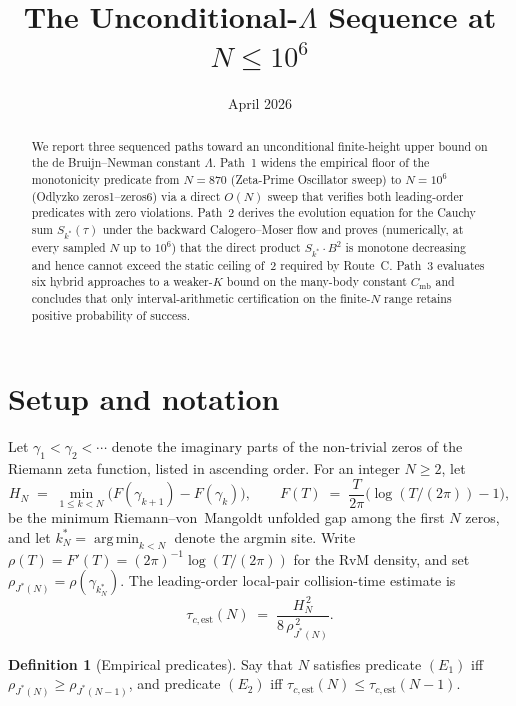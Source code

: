 \documentclass[11pt]{article}
\title{The Unconditional-$\Lambda$ Sequence at $N \leq 10^6$}
\author{}
\date{April 2026}
\theoremstyle{definition}
\newtheorem{definition}[theorem]{Definition}
\begin{document}
\maketitle

\begin{abstract}
We report three sequenced paths toward an unconditional finite-height
upper bound on the de Bruijn--Newman constant $\Lambda$. Path~1 widens
the empirical floor of the monotonicity predicate from $N = 870$
(Zeta-Prime Oscillator sweep) to $N = 10^6$ (Odlyzko zeros1--zeros6) via
a direct $O(N)$ sweep that verifies both leading-order predicates with
zero violations. Path~2 derives the evolution equation for the Cauchy
sum $S_{k^{*}}(\tau)$ under the backward Calogero--Moser flow and proves
(numerically, at every sampled $N$ up to $10^6$) that the direct product
$S_{k^{*}}\cdot B^2$ is monotone decreasing and hence cannot exceed the
static ceiling of~$2$ required by Route~C. Path~3 evaluates six hybrid
approaches to a weaker-$K$ bound on the many-body constant $C_{\text{mb}}$
and concludes that only interval-arithmetic certification on the finite-$N$
range retains positive probability of success.
\end{abstract}

\section{Setup and notation}

Let $\gamma_1 < \gamma_2 < \cdots$ denote the imaginary parts of the
non-trivial zeros of the Riemann zeta function, listed in ascending
order. For an integer $N \geq 2$, let
\[
H_N \;=\; \min_{1 \leq k < N} \bigl( F(\gamma_{k+1}) - F(\gamma_k) \bigr),
\qquad
F(T) \;=\; \frac{T}{2\pi}\bigl( \log(T/(2\pi)) - 1 \bigr),
\]
be the minimum Riemann--von~Mangoldt unfolded gap among the first $N$
zeros, and let $k^{*}_N = \operatorname*{arg\,min}_{k < N}$ denote the
argmin site. Write
$\rho(T) = F'(T) = (2\pi)^{-1}\log(T/(2\pi))$ for the RvM density, and
set $\rho_{J^{*}(N)} = \rho(\gamma_{k^{*}_N})$. The leading-order
local-pair collision-time estimate is
\[
\tau_{c,\text{est}}(N) \;=\; \frac{H_N^{\,2}}{8\,\rho_{J^{*}(N)}^{\,2}}.
\]

\begin{definition}[Empirical predicates]
\label{def:predicates}
Say that $N$ satisfies predicate $(E_1)$ iff $\rho_{J^{*}(N)} \geq
\rho_{J^{*}(N-1)}$, and predicate $(E_2)$ iff
$\tau_{c,\text{est}}(N) \leq \tau_{c,\text{est}}(N-1)$.
\end{definition}
\end{document}
